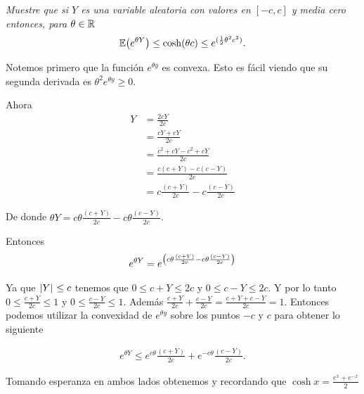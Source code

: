 \emph{
     Muestre que si $Y$ es una variable aleatoria con valores en $[-c,c]$ y media cero entonces, para $\theta\in\mathbb{R}$
    \begin{align}
        \mathbb{E}\! \left( e^{\theta Y} \right) \leq \cosh(\theta c)\leq e^{(\frac{1}{2}\theta^2c^2)}. 
    \end{align}
}

\afterstatement\par\null

Notemos primero que la función $e^{\theta y}$ es convexa. Esto es fácil viendo que su segunda derivada es
$\theta^2 e^{\theta y} \geq 0$.\par\null

Ahora
\begin{align}
    Y   &=  \frac{2cY}{2c}                  \\
        &=  \frac{cY + cY}{2c}              \\
        &=  \frac{c^2 + cY - c^2+ cY}{2c}   \\
        &=  \frac{c(c + Y) - c (c - Y)}{2c} \\  
        &=  c\frac{(c + Y)}{2c} - c \frac{(c - Y)}{2c}  
\end{align}\par\null

De donde $\theta Y = c\theta \frac{(c + Y)}{2c} - c\theta \frac{(c - Y)}{2c}$.\par\null

Entonces
\begin{align}
    e^{\theta Y} = e^{\left( c\theta \frac{(c + Y)}{2c} - c\theta \frac{(c - Y)}{2c}\right) }
\end{align}\par\null

Ya que $\hspace{.25mm}\left|Y\right|\hspace{.25mm} \leq c$ tenemos que $0 \leq c + Y \leq 2c$ y $0 \leq c - Y \leq 2c$. Y por lo tanto 
$0 \leq \frac{c + Y}{2c} \leq 1$ y $0 \leq \frac{c - Y}{2c} \leq 1$. 
Además $\frac{c + Y}{2c} + \frac{c - Y}{2c} = \frac{c + Y + c - Y }{2c} = 1$. Entonces podemos utilizar 
la convexidad de $e^{\theta y}$ sobre los puntos $-c$ y $c$ para obtener lo siguiente

\begin{align}
    e^{\theta Y} \leq e^{c\theta} \frac{(c + Y)}{2c} + e^{-c\theta} \frac{(c - Y)}{2c}.
\end{align}\par\null

Tomando esperanza en ambos lados obtenemos y recordando que $\cosh{x} = \frac{e^x + e^{-x}}{2}$

